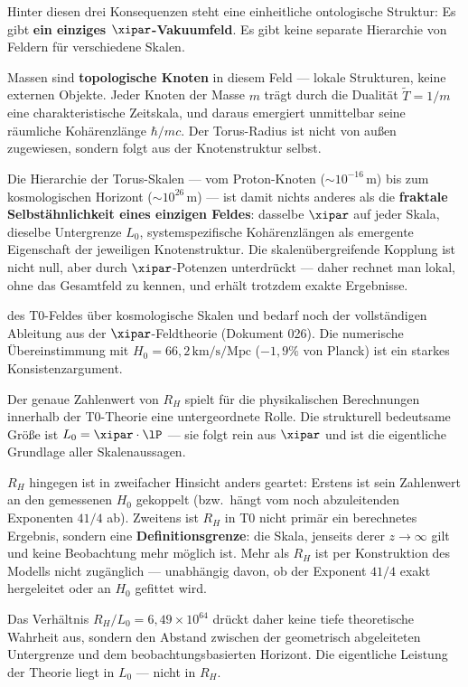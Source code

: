 \begin{keypoint}
Hinter diesen drei Konsequenzen steht eine einheitliche ontologische Struktur: Es gibt \textbf{ein einziges $\xipar$-Vakuumfeld}. Es gibt keine separate Hierarchie von Feldern für verschiedene Skalen.

Massen sind \textbf{topologische Knoten} in diesem Feld — lokale Strukturen, keine externen Objekte. Jeder Knoten der Masse $m$ trägt durch die Dualität $\tilde{T} = 1/m$ eine charakteristische Zeitskala, und daraus emergiert unmittelbar seine räumliche Kohärenzlänge $\hbar/mc$. Der Torus-Radius ist nicht von außen zugewiesen, sondern folgt aus der Knotenstruktur selbst.

Die Hierarchie der Torus-Skalen — vom Proton-Knoten ($\sim 10^{-16}$\,m) bis zum kosmologischen Horizont ($\sim 10^{26}$\,m) — ist damit nichts anderes als die \textbf{fraktale Selbstähnlichkeit eines einzigen Feldes}: dasselbe $\xipar$ auf jeder Skala, dieselbe Untergrenze $L_0$, systemspezifische Kohärenzlängen als emergente Eigenschaft der jeweiligen Knotenstruktur. Die skalenübergreifende Kopplung ist nicht null, aber durch $\xipar$-Potenzen unterdrückt — daher rechnet man lokal, ohne das Gesamtfeld zu kennen, und erhält trotzdem exakte Ergebnisse.
\end{keypoint}

 des T0-Feldes über kosmologische Skalen und bedarf noch der vollständigen Ableitung aus der $\xipar$-Feldtheorie (Dokument 026). Die numerische Übereinstimmung mit $H_0 = 66{,}2\,\text{km/s/Mpc}$ ($-1{,}9\%$ von Planck) ist ein starkes Konsistenzargument.

\begin{foundation}
Der genaue Zahlenwert von $R_H$ spielt für die physikalischen Berechnungen innerhalb der T0-Theorie eine untergeordnete Rolle. Die strukturell bedeutsame Größe ist $L_0 = \xipar \cdot \lP$ — sie folgt rein aus $\xipar$ und ist die eigentliche Grundlage aller Skalenaussagen.

$R_H$ hingegen ist in zweifacher Hinsicht anders geartet: Erstens ist sein Zahlenwert an den gemessenen $H_0$ gekoppelt (bzw.\ hängt vom noch abzuleitenden Exponenten $41/4$ ab). Zweitens ist $R_H$ in T0 nicht primär ein berechnetes Ergebnis, sondern eine \textbf{Definitionsgrenze}: die Skala, jenseits derer $z \to \infty$ gilt und keine Beobachtung mehr möglich ist. Mehr als $R_H$ ist per Konstruktion des Modells nicht zugänglich — unabhängig davon, ob der Exponent $41/4$ exakt hergeleitet oder an $H_0$ gefittet wird.

Das Verhältnis $R_H/L_0 = 6{,}49 \times 10^{64}$ drückt daher keine tiefe theoretische Wahrheit aus, sondern den Abstand zwischen der geometrisch abgeleiteten Untergrenze und dem beobachtungsbasierten Horizont. Die eigentliche Leistung der Theorie liegt in $L_0$ — nicht in $R_H$.
\end{foundation}

